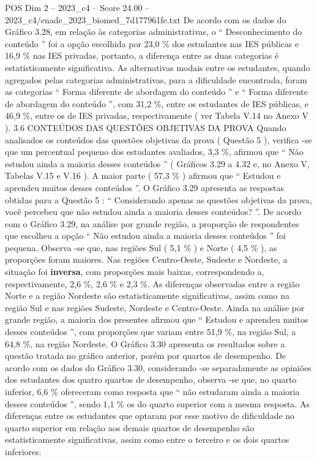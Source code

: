 \begin{textsample}{POS Dim 2 – 2023\_c4 – Score 24.00 – 2023\_c4/enade\_2023\_biomed\_7d177961fe.txt}
De acordo com os dados do Gráfico 3.28, em relação às categorias administrativas, o “ Desconhecimento do conteúdo ” foi a opção escolhida por 23,0 \% dos estudantes nas IES públicas e 16,9 \% nas IES privadas, portanto, a diferença entre as duas categorias é estatisticamente significativa.
As alternativas modais entre os estudantes, quando agregados pelas categorias administrativas, para a dificuldade encontrada, foram as categorias “ Forma diferente de abordagem do conteúdo ” e “ Forma diferente de abordagem do conteúdo ”, com 31,2 \%, entre os estudantes de IES públicas, e 46,9 \%, entre os de IES privadas, respectivamente ( ver Tabela V.14 no Anexo V ). 3.6 CONTEÚDOS DAS QUESTÕES OBJETIVAS DA PROVA Quando analisados os conteúdos das questões objetivas da prova ( Questão 5 ), verifica -se que um percentual pequeno dos estudantes avaliados, 3,3 \%, afirmou que “ Não estudou ainda a maioria desses conteúdos ” ( Gráficos 3.29 a 4.32 e, no Anexo V, Tabelas V.15 e V.16 ).
A maior parte ( 57,3 \% ) afirmou que “ Estudou e aprendeu muitos desses conteúdos ”.
O Gráfico 3.29 apresenta as respostas obtidas para a Questão 5 : “ Considerando apenas as questões objetivas da prova, você percebeu que não estudou ainda a maioria desses conteúdos? ”.
De acordo com o Gráfico 3.29, na análise por grande região, a proporção de respondentes que escolheu a opção “ Não estudou ainda a maioria desses conteúdos ” foi pequena.
Observa -se que, nas regiões Sul ( 5,1 \% ) e Norte ( 4,5 \% ), as proporções foram maiores.
Nas regiões Centro-Oeste, Sudeste e Nordeste, a situação foi \textbf{inversa}, com proporções mais baixas, correspondendo a, respectivamente, 2,6 \%, 2,6 \% e 2,3 \%.
As diferenças observadas entre a região Norte e a região Nordeste são estatisticamente significativas, assim como na região Sul e nas regiões Sudeste, Nordeste e Centro-Oeste.
Ainda na análise por grande região, a maioria dos presentes afirmou que “ Estudou e aprendeu muitos desses conteúdos ”, com proporções que variam entre 51,9 \%, na região Sul, a 64,8 \%, na região Nordeste.
O Gráfico 3.30 apresenta os resultados sobre a questão tratada no gráfico anterior, porém por quartos de desempenho.
De acordo com os dados do Gráfico 3.30, considerando -se separadamente as opiniões dos estudantes dos quatro quartos de desempenho, observa -se que, no quarto inferior, 6,6 \% ofereceram como resposta que “ não estudaram ainda a maioria desses conteúdos ”, sendo 1,1 \% os do quarto superior com a mesma resposta.
As diferenças entre os estudantes que optaram por esse motivo de dificuldade no quarto superior em relação aos demais quartos de desempenho são estatisticamente significativas, assim como entre o terceiro e os dois quartos inferiores.

\end{textsample}

